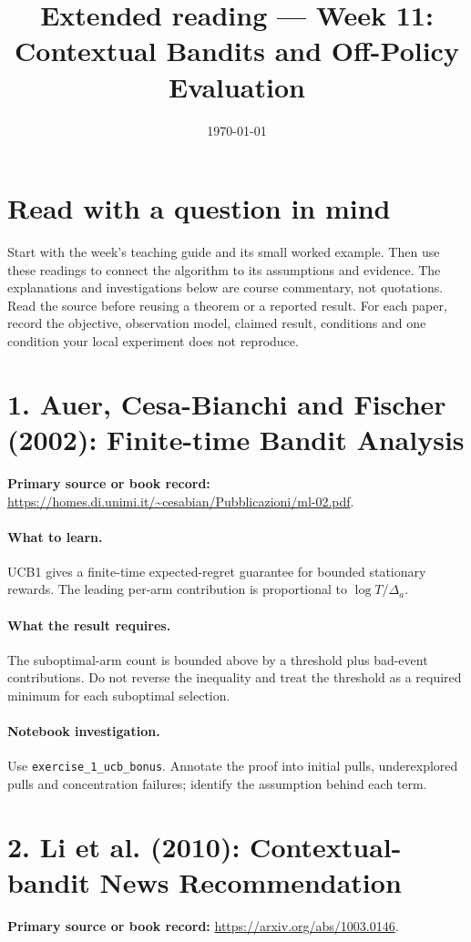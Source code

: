 \documentclass[11pt]{scrartcl}
\title{Extended reading --- Week 11: Contextual Bandits and Off-Policy Evaluation}
\date{\today}
\begin{document}
\maketitle
\section*{Read with a question in mind}
Start with the week's teaching guide and its small worked example. Then use
these readings to connect the algorithm to its assumptions and evidence.
The explanations and investigations below are course commentary, not
quotations. Read the source before reusing a theorem or a reported result.
For each paper, record the objective, observation model, claimed result,
conditions and one condition your local experiment does not reproduce.

\section*{1. Auer, Cesa-Bianchi and Fischer (2002): Finite-time Bandit Analysis}
\textbf{Primary source or book record:} \url{https://homes.di.unimi.it/~cesabian/Pubblicazioni/ml-02.pdf}.

\paragraph{What to learn.} UCB1 gives a finite-time expected-regret guarantee for bounded stationary rewards. The leading per-arm contribution is proportional to $\log T/\Delta_a$.

\paragraph{What the result requires.} The suboptimal-arm count is bounded above by a threshold plus bad-event contributions. Do not reverse the inequality and treat the threshold as a required minimum for each suboptimal selection.

\paragraph{Notebook investigation.} Use \texttt{exercise\_1\_ucb\_bonus}. Annotate the proof into initial pulls, underexplored pulls and concentration failures; identify the assumption behind each term.

\section*{2. Li et al. (2010): Contextual-bandit News Recommendation}
\textbf{Primary source or book record:} \url{https://arxiv.org/abs/1003.0146}.
\end{document}
